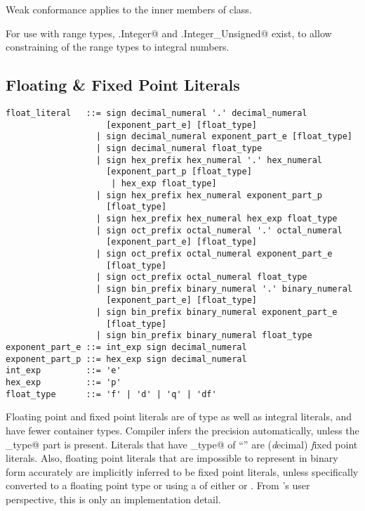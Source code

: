 Weak conformance applies to the inner members of \lstinline@Number@ class. 

For use with range types, \lstinline@Number.Integer@ and \lstinline@Number.Integer_Unsigned@ exist, to allow constraining of the range types to integral numbers.






\subsection{Floating \& Fixed Point Literals}
\label{sec:floatliterals}
\label{sec:fixedpointliterals}

\syntax\begin{lstlisting}
float_literal   ::= sign decimal_numeral '.' decimal_numeral
                    [exponent_part_e] [float_type]
                  | sign decimal_numeral exponent_part_e [float_type]
                  | sign decimal_numeral float_type
                  | sign hex_prefix hex_numeral '.' hex_numeral 
                    [exponent_part_p [float_type] 
                     | hex_exp float_type]
                  | sign hex_prefix hex_numeral exponent_part_p 
                    [float_type]
                  | sign hex_prefix hex_numeral hex_exp float_type
                  | sign oct_prefix octal_numeral '.' octal_numeral 
                    [exponent_part_e] [float_type]
                  | sign oct_prefix octal_numeral exponent_part_e 
                    [float_type]
                  | sign oct_prefix octal_numeral float_type
                  | sign bin_prefix binary_numeral '.' binary_numeral 
                    [exponent_part_e] [float_type]
                  | sign bin_prefix binary_numeral exponent_part_e 
                    [float_type]
                  | sign bin_prefix binary_numeral float_type
exponent_part_e ::= int_exp sign decimal_numeral
exponent_part_p ::= hex_exp sign decimal_numeral
int_exp         ::= 'e'
hex_exp         ::= 'p'
float_type      ::= 'f' | 'd' | 'q' | 'df'
\end{lstlisting}

Floating point and fixed point literals are of type \lstinline@Number@ as well as integral literals, and have fewer container types. Compiler infers the precision automatically, unless the \lstinline@float_type@ part is present. Literals that have \lstinline@float_type@ of ``'' are ({\em d}ecimal) {\em f}ixed point literals. Also, floating point literals that are impossible to represent in binary form accurately are implicitly inferred to be fixed point literals, unless specifically converted to a floating point type or using a  of either  or . From 's user perspective, this is only an implementation detail. 

